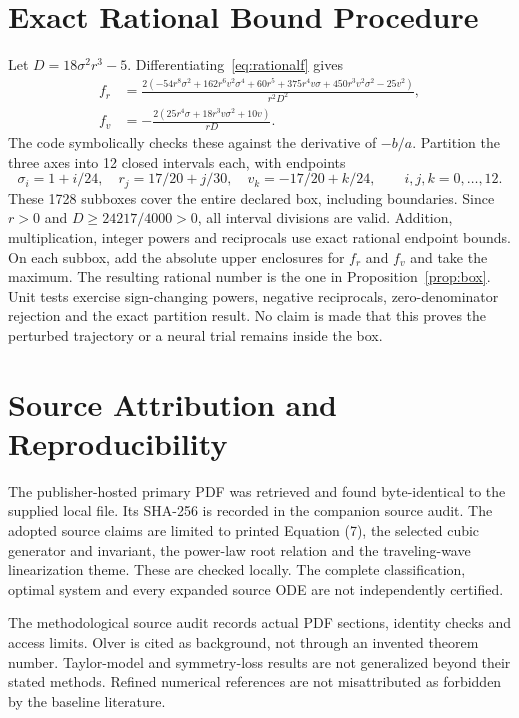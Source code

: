 \documentclass[11pt,a4paper]{article}
\theoremstyle{definition}
\theoremstyle{remark}
\begin{document}
\appendix
\section{Exact Rational Bound Procedure}\label{app:interval}
Let $D=18\sigma^2r^3-5$. Differentiating~\eqref{eq:rationalf} gives
\begin{align}
f_r&=\frac{2(-54r^8\sigma^2+162r^6v^2\sigma^4+60r^5
+375r^4v\sigma+450r^3v^2\sigma^2-25v^2)}{r^2D^2},\\
f_v&=-\frac{2(25r^4\sigma+18r^3v\sigma^2+10v)}{rD}.
\end{align}
The code symbolically checks these against the derivative of $-b/a$.
Partition the three axes into 12 closed intervals each, with endpoints
\[
\sigma_i=1+i/24,\quad r_j=17/20+j/30,\quad v_k=-17/20+k/24,
\qquad i,j,k=0,\ldots,12.
\]
These 1728 subboxes cover the entire declared box, including boundaries.
Since $r>0$ and $D\ge24217/4000>0$, all interval divisions are valid.
Addition, multiplication, integer powers and reciprocals use exact rational endpoint bounds. On each subbox, add the absolute upper enclosures for $f_r$ and $f_v$ and take the maximum. The resulting rational number is the one in Proposition~\ref{prop:box}. Unit tests exercise sign-changing powers, negative reciprocals, zero-denominator rejection and the exact partition result. No claim is made that this proves the perturbed trajectory or a neural trial remains inside the box.

\section{Source Attribution and Reproducibility}\label{app:sources}
The publisher-hosted primary PDF was retrieved and found byte-identical to the supplied local file. Its SHA-256 is recorded in the companion source audit. The adopted source claims are limited to printed Equation (7), the selected cubic generator and invariant, the power-law root relation and the traveling-wave linearization theme. These are checked locally. The complete classification, optimal system and every expanded source ODE are not independently certified.

The methodological source audit records actual PDF sections, identity checks and access limits. Olver is cited as background, not through an invented theorem number. Taylor-model and symmetry-loss results are not generalized beyond their stated methods. Refined numerical references are not misattributed as forbidden by the baseline literature.
\end{document}
